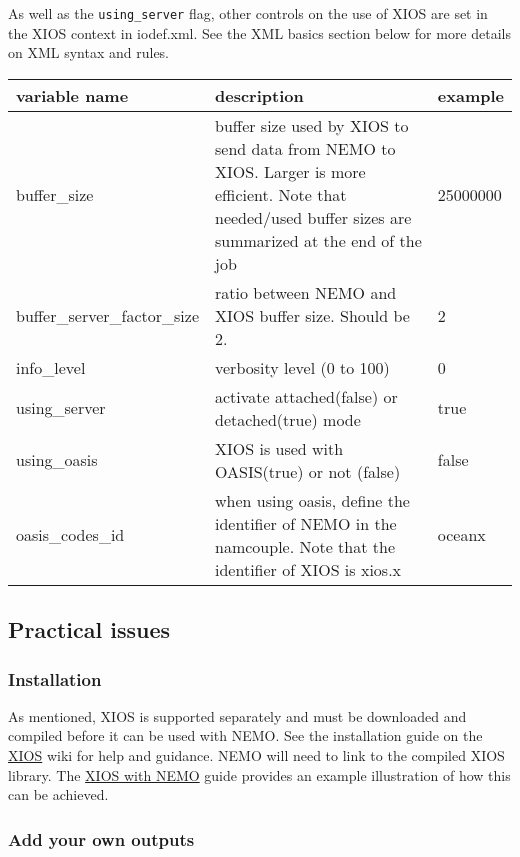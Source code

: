 \documentclass[NEMO_book]{subfiles}
\begin{document}
As well as the {\tt using\_server} flag, other controls on the use of XIOS are set in the XIOS context in iodef.xml. See the XML basics section below for more details on XML syntax and rules.

\begin{tabular}{|p{4cm}|p{6.0cm}|p{2.0cm}|}
   \hline
   variable name & 
   description & 
   example \\ 
   \hline   
   \hline
   buffer\_size & 
   buffer size used by XIOS to send data from NEMO to XIOS. Larger is more efficient. Note that needed/used buffer sizes are summarized at the end of the job & 
   25000000 \\ 
   \hline   
   buffer\_server\_factor\_size & 
   ratio between NEMO and XIOS buffer size. Should be 2. & 
   2 \\ 
   \hline
   info\_level & 
   verbosity level (0 to 100) & 
   0 \\ 
   \hline
   using\_server & 
   activate attached(false) or detached(true) mode & 
   true \\ 
   \hline
   using\_oasis & 
   XIOS is used with OASIS(true) or not (false) & 
   false \\ 
   \hline
   oasis\_codes\_id & 
   when using oasis, define the identifier of NEMO in the namcouple. Note that the identifier of XIOS is xios.x & 
   oceanx \\ 
   \hline   
\end{tabular}


\subsection{Practical issues}

\subsubsection{Installation}

As mentioned, XIOS is supported separately and must be downloaded and compiled before it can be used with NEMO. See the installation guide on the \href{http://forge.ipsl.jussieu.fr/ioserver/wiki}{XIOS} wiki for help and guidance. NEMO will need to link to the compiled XIOS library. The 
\href{http://www.nemo-ocean.eu/Using-NEMO/User-Guides/Basics/XIOS-IO-server-installation-and-use}{XIOS with NEMO} guide provides an example illustration of how this can be achieved.

\subsubsection{Add your own outputs}
\end{document}
